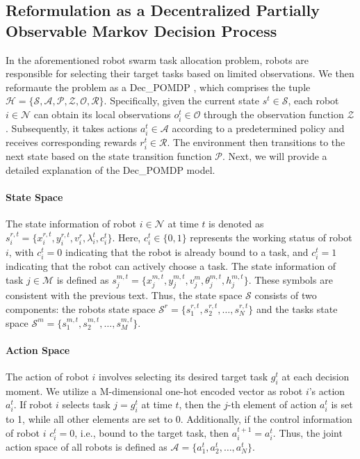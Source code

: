 \documentclass[lettersize,journal]{IEEEtran}
\begin{document}
\subsection{Reformulation as a  Decentralized Partially Observable Markov Decision Process}\label{subsection2.2}
In the aforementioned robot swarm task allocation problem, robots are responsible for selecting their target tasks based on limited observations. We then reformaute the problem as a Dec\_POMDP \cite{oliehoek2016concise}, which comprises the tuple $\mathcal{H}=\{\mathcal{S},\mathcal{A},\mathcal{P},\mathcal{Z},\mathcal{O},\mathcal{R}\}$. Specifically, given the current state $s^t\in\mathcal{S}$, each robot $i\in\mathcal{N}$ can obtain its local observations $o_i^t\in\mathcal{O}$ through the observation function $\mathcal{Z}$. Subsequently, it takes actions $a_i^t\in\mathcal{A}$ according to a predetermined policy and receives corresponding rewards $r_i^t\in\mathcal{R}$. The environment then transitions to the next state based on the state transition function $\mathcal{P}$. Next, we will provide a detailed explanation of the Dec\_POMDP model.

\paragraph{\textbf{State Space}} The state information of robot  $i\in\mathcal{N}$ at time $t$ is denoted as $s_i^{r,t}=\{x_i^{r,t},y_i^{r,t},v_i^r,\lambda_i^t,c_i^t\}$. Here, $c_i^t\in\{0,1\}$ represents the working status of robot $i$, with  $c_i^t=0$ indicating that the robot is already bound to a task, and  $c_i^t=1$ indicating that the robot can actively choose a task. The state information of task $j\in\mathcal{M}$ is defined as $s_j^{m,t}=\{x_j^{m,t},y_j^{m,t},v_j^m,\theta_j^{m,t},h_j^{m,t}\}$. These symbols are consistent with the previous text. Thus, the state space $\mathcal{S}$ consists of two components: the robots state space $\mathcal{S}^r=\{s_1^{r,t},s_2^{r,t},\ldots,s_N^{r,t}\}$ and the tasks state space  $\mathcal{S}^m=\{s_1^{m,t},s_2^{m,t},\ldots,s_M^{m,t}\}$.

\paragraph{\textbf{Action Space}} The action of robot $i$ involves selecting its desired target task $g_i^t$ at each decision moment. We utilize a M-dimensional one-hot encoded vector  as robot $i$'s action $a_i^t$. If robot $i$ selects task $j=g_i^t$ at time $t$, then the $j$-th element of action $a_i^t$ is set to 1, while all other elements are set to 0. Additionally, if the control information of robot $i$ $c_i^t=0$, i.e., bound to the target task, then $a_i^{t+1}=a_i^t$. Thus, the joint action space of all robots is defined as  $\mathcal{A}=\{a_{1}^{t},a_{2}^{t},\ldots,a_{N}^{t}\}$.
\end{document}
